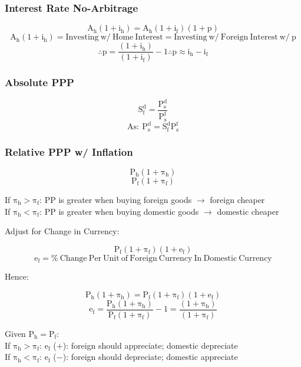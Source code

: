 \documentclass[11pt, english]{article}
\begin{document}
		\subsubsection{Interest Rate No-Arbitrage}

	$$\mathrm{A_h(1+i_h)=A_h(1+i_f)(1+p)}$$
	$$\mathrm{A_h(1+i_h)=Investing\ w/\ Home\ Interest=Investing\ w/\ Foreign\ Interest\ w/\ p}$$
	$$\mathrm{\therefore p=\frac{(1+i_h)}{(1+i_f)}-1\therefore p\approx i_h-i_f}$$

		\subsubsection{Absolute PPP}

	$$\mathrm{S_f^d=\frac{P_s^d}{P_s^f}}$$
	$$\mathrm{As:\ P_s^d=S_f^dP_s^f}$$

		\subsubsection{Relative PPP w/ Inflation}

	$$\mathrm{P_h(1+\pi_h)}$$
	$$\mathrm{P_f(1+\pi_f)}$$

	\begin{center}
	If $\mathrm{\pi_h>\pi_f}$: PP is greater when buying foreign goods $\rightarrow$ foreign cheaper\\
	If $\mathrm{\pi_h<\pi_f}$: PP is greater when buying domestic goods $\rightarrow$
domestic cheaper
	\end{center}

	\begin{center}Adjust for Change in Currency:\end{center}
	$$\mathrm{P_f(1+\pi_f)(1+e_f)}$$
	$$\mathrm{e_f=\%\ Change\ Per\ Unit\ of\ Foreign\ Currency\ In\ Domestic\ Currency}$$

	\begin{center}Hence:\end{center}
	$$\mathrm{P_h(1+\pi_h)=P_f(1+\pi_f)(1+e_f)}$$
	$$\mathrm{e_f=\frac{P_h(1+\pi_h)}{P_f(1+\pi_f)}-1=\frac{(1+\pi_h)}{(1+\pi_f)}}$$

	\begin{center}Given $\mathrm{P_h=P_f}$:\\
	If $\mathrm{\pi_h>\pi_f}$: $\mathrm{e_f}$ ($+$): foreign should appreciate; domestic depreciate\\
	If $\mathrm{\pi_h<\pi_f}$: $\mathrm{e_f}$ ($-$): foreign should depreciate; domestic appreciate
	\end{center}
\end{document}
